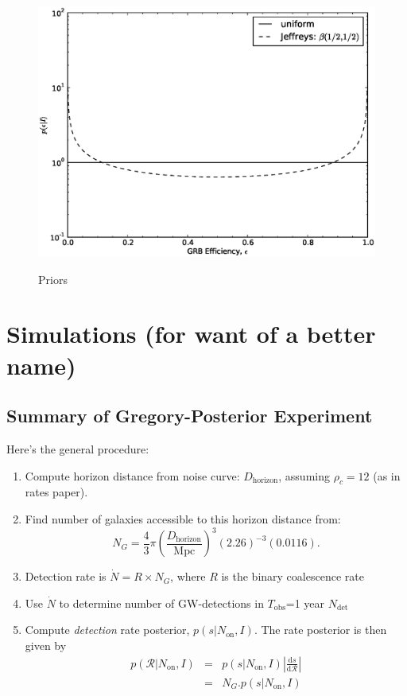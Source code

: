 \documentclass[twocolumn,nofootinbib]{revtex4-1}
\newcommand{\cbcrate}{{{\mathcal R}}}
\newcommand{\diff}{{\mathrm d}}
\begin{document}
\begin{figure}%
\centering
{\includegraphics[width=\linewidth]{efficiency_prior.eps}}\label{fig:priors}
\caption{Priors}
\end{figure}


\section{Simulations (for want of a better name)}

\subsection{Summary of Gregory-Posterior Experiment}
Here's the general procedure:
\begin{enumerate}
\item Compute horizon distance from noise curve: $D_{\mathrm{horizon}}$,
assuming $\rho_c=12$ (as in rates paper).
\item Find number of galaxies accessible to this horizon distance from:
\begin{equation}
N_G = \frac{4}{3} \pi \left( \frac{D_{\textrm{horizon}}}{\textrm{Mpc}}
\right)^3 (2.26)^{-3} (0.0116).
\end{equation}
\item Detection rate is $\dot{N} = R \times N_G$, where $R$ is the binary
coalescence rate
\item Use $\dot{N}$ to determine number of GW-detections in $T_{\mathrm{obs}}$=1 year
$N_{\mathrm{det}}$
\item Compute \emph{detection} rate posterior, $p(s|N_{\textrm{on}},I)$.  The
rate posterior is then given by 
\begin{eqnarray}
p(\cbcrate|N_{\textrm{on}},I) & = & p(s|N_{\textrm{on}},I) \left|\frac{\diff
s}{\diff \cbcrate}\right| \\
& = & N_G . p(s|N_{\textrm{on}},I)
\end{eqnarray}
\end{enumerate}
\end{document}
